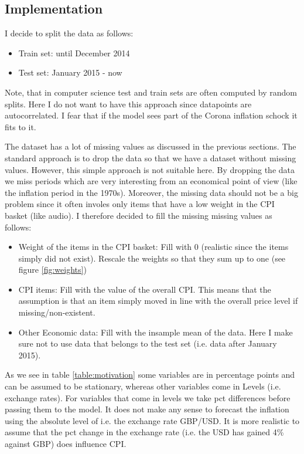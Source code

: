 \documentclass[12pt]{article}
\begin{document}
\subsection{Implementation}
I decide to split the data as follows:
\begin{itemize}
\item Train set: until December 2014
\item Test set: January 2015 - now
\end{itemize}
Note, that in computer science test and train sets are often computed by random splits. Here I do not want to have this approach since datapoints are autocorrelated. I fear that if the model sees part of the Corona inflation schock it fits to it. 


The dataset has a lot of missing values as discussed in the previous sections. The standard approach is to drop the data so that we have a dataset without missing values. However, this simple approach is not suitable here. By dropping the data we miss periods which are very interesting from an economical point of view (like the inflation period in the 1970s). Moreover, the missing data should not be a big problem since it often involes only items that have a low weight in the CPI basket (like audio). I therefore decided to fill the missing missing values as follows:
\begin{itemize}
\item Weight of the items in the CPI basket: Fill with 0 (realistic since the items simply did not exist). Rescale the weights so that they sum up to one (see figure \ref{fig:weights})
\item CPI items: Fill with the value of the overall CPI. This means that the assumption is that an item simply moved in line with the overall price level if missing/non-existent.
\item Other Economic data: Fill with the insample mean of the data. Here I make sure not to use data that belongs to the test set (i.e. data after January 2015).
\end{itemize}

As we see in table \ref{table:motivation} some variables are in percentage points and can be assumed to be stationary, whereas other variables come in Levels (i.e. exchange rates). For variables that come in levels we take pct differences before passing them to the model. It does not make any sense to forecast the inflation using the absolute level of i.e. the exchange rate GBP/USD. It is more realistic to assume that the pct change in the exchange rate (i.e. the USD has gained 4\% against GBP) does influence CPI.
\end{document}
